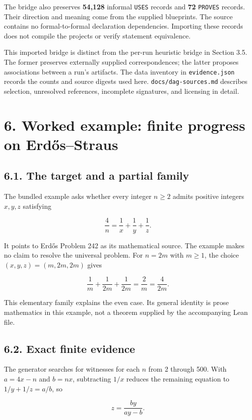 \documentclass[11pt,a4paper]{article}
\begin{document}
The bridge also preserves \textbf{54,128} informal \nolinkurl{USES} records and \textbf{72} \nolinkurl{PROVES} records. Their direction and meaning come from the supplied blueprints. The source contains no formal-to-formal declaration dependencies. Importing these records does not compile the projects or verify statement equivalence.

This imported bridge is distinct from the per-run heuristic bridge in Section 3.5. The former preserves externally supplied correspondences; the latter proposes associations between a run's artifacts. The data inventory in \nolinkurl{evidence.json} records the counts and source digests used here. \nolinkurl{docs/dag-sources.md} describes selection, unresolved references, incomplete signatures, and licensing in detail.

\section*{6. Worked example: finite progress on Erd\H{o}s--Straus}

\subsection*{6.1. The target and a partial family}

The bundled example asks whether every integer $n\geq 2$ admits positive integers $x,y,z$ satisfying

\[
\frac{4}{n}=\frac{1}{x}+\frac{1}{y}+\frac{1}{z}.
\]

It points to Erd\H{o}s Problem 242 as its mathematical source. The example makes no claim to resolve the universal problem. For $n=2m$ with $m\geq 1$, the choice $(x,y,z)=(m,2m,2m)$ gives

\[
\frac{1}{m}+\frac{1}{2m}+\frac{1}{2m}=\frac{2}{m}=\frac{4}{2m}.
\]

This elementary family explains the even case. Its general identity is prose mathematics in this example, not a theorem supplied by the accompanying Lean file.

\subsection*{6.2. Exact finite evidence}

The generator searches for witnesses for each $n$ from 2 through 500. With $a=4x-n$ and $b=nx$, subtracting $1/x$ reduces the remaining equation to $1/y+1/z=a/b$, so

\[
z=\frac{by}{ay-b}.
\]
\end{document}
